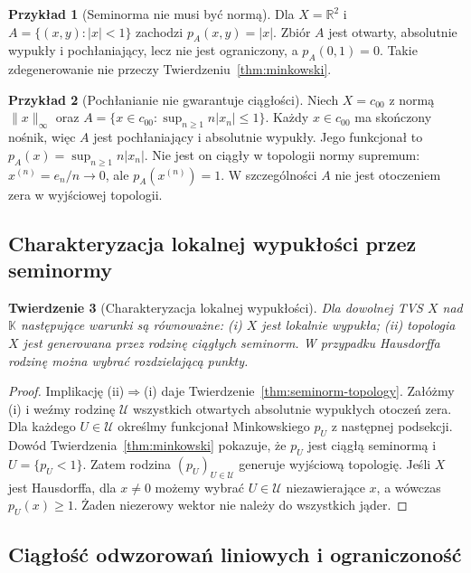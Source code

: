 \documentclass[11pt,a4paper]{article}
\numberwithin{equation}{section}
\theoremstyle{plain}
\newtheorem{twierdzenie}{Twierdzenie}[section]
\theoremstyle{definition}
\newtheorem{przyklad}[twierdzenie]{Przykład}
\theoremstyle{remark}
\newcommand{\R}{\mathbb R}
\newcommand{\K}{\mathbb K}
\begin{document}
\begin{przyklad}[Seminorma nie musi być normą]
Dla $X=\R^2$ i $A=\{(x,y):|x|<1\}$ zachodzi
$p_A(x,y)=|x|$. Zbiór $A$ jest otwarty, absolutnie
wypukły i pochłaniający, lecz nie jest ograniczony,
a $p_A(0,1)=0$. Takie zdegenerowanie nie przeczy
Twierdzeniu~\ref{thm:minkowski}.
\end{przyklad}

\begin{przyklad}[Pochłanianie nie gwarantuje ciągłości]
Niech $X=c_{00}$ z normą $\|x\|_\infty$ oraz
$A=\{x\in c_{00}:\sup_{n\ge1}n|x_n|\le1\}$.
Każdy $x\in c_{00}$ ma skończony nośnik, więc $A$
jest pochłaniający i absolutnie wypukły. Jego funkcjonał
to $p_A(x)=\sup_{n\ge1}n|x_n|$. Nie jest on ciągły
w topologii normy supremum: $x^{(n)}=e_n/n\to0$,
ale $p_A(x^{(n)})=1$. W szczególności $A$ nie jest
otoczeniem zera w wyjściowej topologii.
\end{przyklad}

\subsection{Charakteryzacja lokalnej wypukłości przez seminormy}

\begin{twierdzenie}[Charakteryzacja lokalnej wypukłości]
\label{thm:lcs-seminorms}
Dla dowolnej TVS $X$ nad $\K$ następujące warunki są
równoważne: (i) $X$ jest lokalnie wypukła;
(ii) topologia $X$ jest generowana przez rodzinę
ciągłych seminorm. W przypadku Hausdorffa rodzinę
można wybrać rozdzielającą punkty.
\end{twierdzenie}
\begin{proof}
Implikację (ii)$\Rightarrow$(i) daje
Twierdzenie~\ref{thm:seminorm-topology}.
Załóżmy (i) i weźmy rodzinę $\mathcal U$ wszystkich
otwartych absolutnie wypukłych otoczeń zera.
Dla każdego $U\in\mathcal U$ określmy funkcjonał
Minkowskiego $p_U$ z następnej podsekcji. Dowód
Twierdzenia~\ref{thm:minkowski} pokazuje, że $p_U$
jest ciągłą seminormą i $U=\{p_U<1\}$. Zatem
rodzina $(p_U)_{U\in\mathcal U}$ generuje wyjściową
topologię. Jeśli $X$ jest Hausdorffa, dla $x\ne0$
możemy wybrać $U\in\mathcal U$ niezawierające $x$,
a wówczas $p_U(x)\ge1$. Żaden niezerowy wektor
nie należy do wszystkich jąder.
\end{proof}


\subsection{Ciągłość odwzorowań liniowych i ograniczoność}
\end{document}

